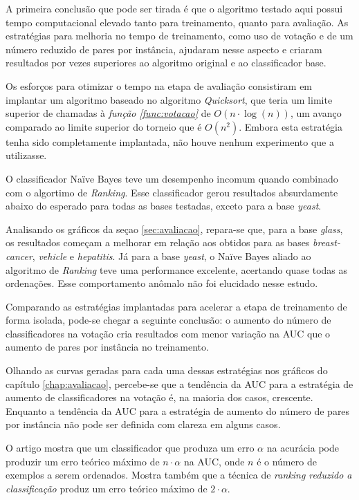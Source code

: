 A primeira conclusão que pode ser tirada é que o algoritmo testado aqui possui tempo computacional elevado tanto para treinamento, quanto para avaliação. As estratégias para melhoria no tempo de treinamento, como uso de votação e de um número reduzido de pares por instância, ajudaram nesse aspecto e criaram resultados por vezes superiores ao algoritmo original e ao classificador base.

Os esforços para otimizar o tempo na etapa de avaliação consistiram em implantar um algoritmo baseado no algoritmo \emph{Quicksort}, que teria um limite superior de chamadas à \emph{função \ref{func:votacao}} de $O(n \cdot \log(n))$, um avanço comparado ao limite superior do torneio que é $O(n^2)$. Embora esta estratégia tenha sido completamente implantada, não houve nenhum experimento que a utilizasse.

O classificador Naïve Bayes teve um desempenho incomum quando combinado com o algortimo de \emph{Ranking}. Esse classificador gerou resultados absurdamente abaixo do esperado para todas as bases testadas, exceto para a base \emph{yeast}.

Analisando os gráficos da seçao \ref{sec:avaliacao}, repara-se que, para a base \emph{glass}, os resultados começam a melhorar em relação aos obtidos para as bases \emph{breast-cancer}, \emph{vehicle} e \emph{hepatitis}. Já para a base \emph{yeast}, o Naïve Bayes aliado ao algoritmo de \emph{Ranking} teve uma performance excelente, acertando quase todas as ordenações. Esse comportamento anômalo não foi elucidado nesse estudo.

Comparando as estratégias implantadas para acelerar a etapa de treinamento de forma isolada, pode-se chegar a seguinte conclusão: o aumento do número de classificadores na votação cria resultados com menor variação na AUC que o aumento de pares por instância no treinamento.

Olhando as curvas geradas para cada uma dessas estratégias nos gráficos do capítulo \ref{chap:avaliacao}, percebe-se que a tendência da AUC para a estratégia de aumento de classificadores na votação é, na maioria dos casos, crescente. Enquanto a tendência da AUC para a estratégia de aumento do número de pares por instância não pode ser definida com clareza em alguns casos.

O artigo \cite{langford08} mostra que um classificador que produza um erro $\alpha$ na acurácia pode produzir um erro teórico máximo de $n \cdot \alpha$ na AUC, onde $n$ é o número de exemplos a serem ordenados. Mostra também que a técnica de \emph{ranking reduzido a classificação} produz um erro teórico máximo de $2 \cdot \alpha$.

